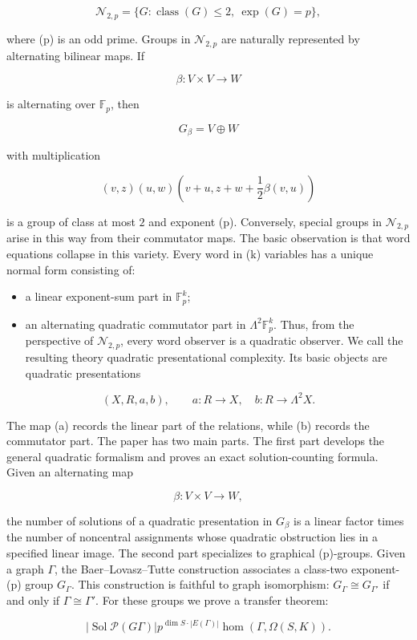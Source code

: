 \documentclass[11pt]{article}
\begin{document}
\[
\mathcal N_{2,p}=\{G:\operatorname{class}(G)\le 2,\ \exp(G)=p\},
\]

where (p) is an odd prime. Groups in $\mathcal N_{2,p}$ are naturally represented by alternating bilinear maps. If

\[
\beta:V\times V\to W
\]

is alternating over $\mathbb F_p$, then

\[
G_\beta=V\oplus W
\]

with multiplication

\[
(v,z)(u,w)
\left(
v+u,
z+w+\frac12\beta(v,u)
\right)
\]

is a group of class at most $2$ and exponent (p). Conversely, special groups in $\mathcal N_{2,p}$ arise in this way from their commutator maps. The basic observation is that word equations collapse in this variety. Every word in (k) variables has a unique normal form consisting of:

\begin{itemize}
\item a linear exponent-sum part in $\mathbb F_p^k$;
\item an alternating quadratic commutator part in $\Lambda^2\mathbb F_p^k$.
Thus, from the perspective of $\mathcal N_{2,p}$, every word observer is a quadratic observer. We call the resulting theory quadratic presentational complexity. Its basic objects are quadratic presentations

\end{itemize}

\[
(X,R,a,b),
\qquad
a:R\to X,\quad b:R\to\Lambda^2X.
\]

The map (a) records the linear part of the relations, while (b) records the commutator part. The paper has two main parts. The first part develops the general quadratic formalism and proves an exact solution-counting formula. Given an alternating map

\[
\beta:V\times V\to W,
\]

the number of solutions of a quadratic presentation in $G_\beta$ is a linear factor times the number of noncentral assignments whose quadratic obstruction lies in a specified linear image. The second part specializes to graphical (p)-groups. Given a graph $\Gamma$, the Baer--Lovasz--Tutte construction associates a class-two exponent-(p) group $G_\Gamma$. This construction is faithful to graph isomorphism: $G_\Gamma\cong G_{\Gamma'}$ if and only if $\Gamma\cong\Gamma'$. For these groups we prove a transfer theorem:

\[
|\operatorname{Sol}
{\mathcal P}(G
\Gamma)|
p^{\dim S\cdot |E(\Gamma)|}
\operatorname{hom}(\Gamma,\Omega(S,K)).
\]
\end{document}
